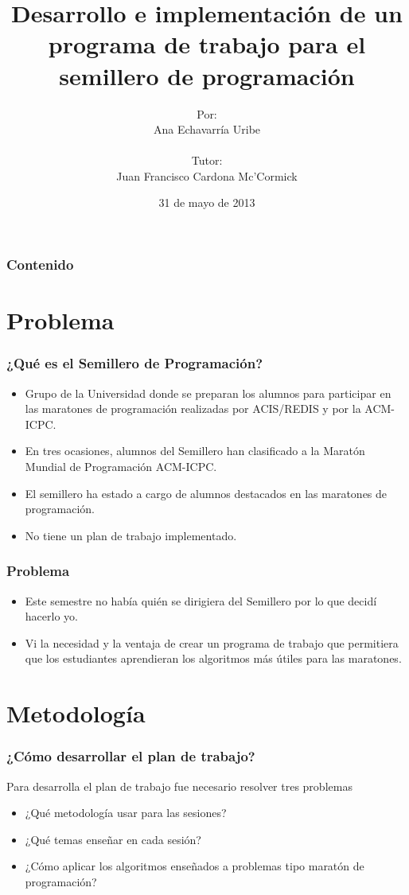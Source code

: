 \documentclass{beamer}
\title{Desarrollo e implementación de un programa de trabajo para el semillero de programación}
\author{Por: \\ Ana Echavarría Uribe \\ \quad \\ Tutor: \\ Juan Francisco Cardona Mc'Cormick}
\institute{Universidad EAFIT}
\date{31 de mayo de 2013}
\begin{document}
\begin{frame}
	\titlepage
\end{frame}

\begin{frame}
	\frametitle{Contenido}
	\tableofcontents
\end{frame}

\section{Problema}
	\begin{frame}
		\frametitle{¿Qué es el Semillero de Programación?}
		\begin{itemize}
			\item Grupo de la Universidad donde se preparan los alumnos para participar en las maratones de programación realizadas por ACIS/REDIS y por la ACM-ICPC.
			\item En tres ocasiones, alumnos del Semillero han clasificado a la Maratón Mundial de Programación ACM-ICPC.
			\item El semillero ha estado a cargo de alumnos destacados en las maratones de programación.
			\item No tiene un plan de trabajo implementado.
		\end{itemize}		
	\end{frame}
	
	\begin{frame}
		\frametitle{Problema}
		\begin{itemize}
			\item Este semestre no había quién se dirigiera del Semillero por lo que decidí hacerlo yo.
			\item Vi la necesidad y la ventaja de crear un programa de trabajo que permitiera que los estudiantes aprendieran los algoritmos más útiles para las maratones.
		\end{itemize}
	\end{frame}
	
\section{Metodología}
	
	\begin{frame}
		\frametitle{¿Cómo desarrollar el plan de trabajo?}
		Para desarrolla el plan de trabajo fue necesario resolver tres problemas
		\begin{itemize}
			\item ¿Qué metodología usar para las sesiones?
			\item ¿Qué temas enseñar en cada sesión?
			\item ¿Cómo aplicar los algoritmos enseñados a problemas tipo maratón de programación?
		\end{itemize}
	\end{frame}
\end{document}
